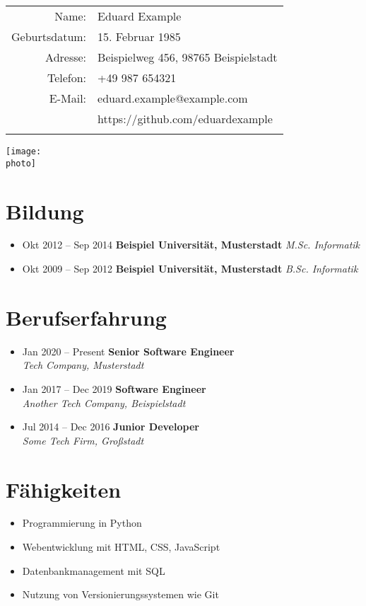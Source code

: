 \documentclass{scrartcl}
\makeatletter
\newcommand{\name}{Max Mustermann}
\newcommand{\birthdate}{1. Januar 1990}
\newcommand{\address}{Musterstraße 123, 12345 Musterstadt}
\newcommand{\phone}{+49 123 456789}
\newcommand{\email}{max.mustermann@example.com}
\newcommand{\photo}{photo.jpg} %
\newcommand{\personaldata}{
    \begin{minipage}{0.75\textwidth}
        \begin{tabular}{rl}
        Name: & \name \\
        Geburtsdatum: & \birthdate \\
        Adresse: & \address \\
        Telefon: & \phone \\
        E-Mail: & \email \\
        \ifthenelse{\isundefined{\github}}{}{GitHub: & \github \\}
        \end{tabular}
    \end{minipage}
    \begin{minipage}{0.24\textwidth}
        \raggedleft
        \texttt{[image: \\photo]} %
    \end{minipage}
    \vspace{1cm} %
}
\newcommand{\educationitem}[3]{%
    \item #1 \textbf{#2} \textit{#3}
}
\newcommand{\education}[1]{
    \section*{Bildung}
    \begin{itemize}[left=0pt]
        #1
    \end{itemize}
}
\newcommand{\careeritem}[3]{%
    \item #1 \hfill \textbf{#2} \\
    \textit{#3}
}
\newcommand{\career}[1]{
    \section*{Berufserfahrung}
    \begin{itemize}[left=0pt]
        #1
    \end{itemize}
}
\newcommand{\skills}[1]{
    \section*{Fähigkeiten}
    \begin{itemize}[left=0pt, label={--}]
        #1
    \end{itemize}
}
\makeatother
\begin{document}
\renewcommand{\name}{Eduard Example}
\renewcommand{\birthdate}{15. Februar 1985}
\renewcommand{\address}{Beispielweg 456, 98765 Beispielstadt}
\renewcommand{\phone}{+49 987 654321}
\renewcommand{\email}{eduard.example@example.com}
\renewcommand{\photo}{photo.jpg}
\newcommand{\github}{https://github.com/eduardexample}  %

\personaldata

\education{
    \educationitem{Okt 2012 -- Sep 2014}{Beispiel Universität, Musterstadt}{M.Sc. Informatik}
    \educationitem{Okt 2009 -- Sep 2012}{Beispiel Universität, Musterstadt}{B.Sc. Informatik}
}

\career{
    \careeritem{Jan 2020 -- Present}{Senior Software Engineer}{Tech Company, Musterstadt}
    \careeritem{Jan 2017 -- Dec 2019}{Software Engineer}{Another Tech Company, Beispielstadt}
    \careeritem{Jul 2014 -- Dec 2016}{Junior Developer}{Some Tech Firm, Großstadt}
}

\skills{
    \item Programmierung in Python
    \item Webentwicklung mit HTML, CSS, JavaScript
    \item Datenbankmanagement mit SQL
    \item Nutzung von Versionierungssystemen wie Git
}
\end{document}
